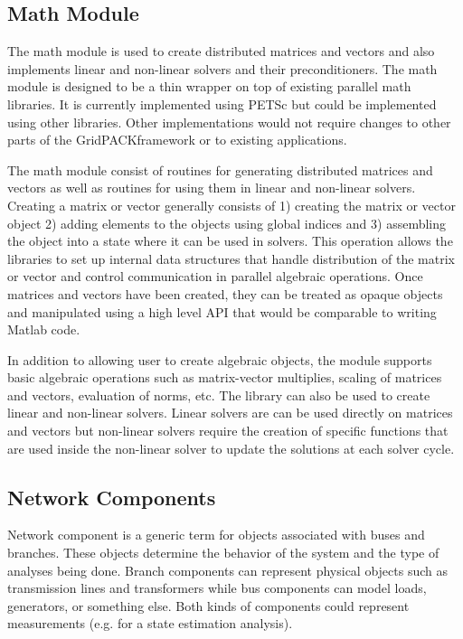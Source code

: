 \documentclass[preprint]{acm_proc_article-sp}
\begin{document}
\subsection{Math Module}
The math module is used to create distributed matrices and vectors and also
implements linear and non-linear solvers and their preconditioners. The math
module is designed to be a thin wrapper on top of existing parallel math
libraries. It is currently implemented using PETSc but could be implemented
using other libraries. Other implementations would not require
changes to other parts of the GridPACK\texttrademark framework or to existing
applications.

The math module consist of routines for generating distributed matrices and
vectors as well as routines for using them in linear and non-linear solvers.
Creating a matrix or vector generally consists of 1) creating the matrix or
vector object 2) adding elements to the objects using global indices and 3)
assembling the object into a state where it can be used in solvers. This
operation allows the libraries to set up internal data structures that handle
distribution of the matrix or vector and control communication
in parallel algebraic operations. Once
matrices and vectors have been created, they can be treated
as opaque objects and manipulated using a
high level API that would be comparable to writing Matlab code.

In addition to allowing user to create algebraic objects, the module
supports basic algebraic operations such as matrix-vector multiplies, scaling of
matrices and vectors, evaluation of norms, etc. The library can
also be used to create linear and non-linear solvers. Linear solvers are
can be used directly on matrices and vectors but non-linear solvers require the
creation of specific
functions that are used inside the non-linear solver to update the solutions at
each solver cycle.

\subsection{Network Components}
Network component is a generic term for objects associated with buses and branches. These
objects determine the behavior of the system and the type of analyses being done. Branch
components can represent physical objects such as transmission lines and
transformers while bus components can model loads, generators, or
something else. Both kinds of components could represent measurements (e.g.
for a state estimation analysis). 
\end{document}
